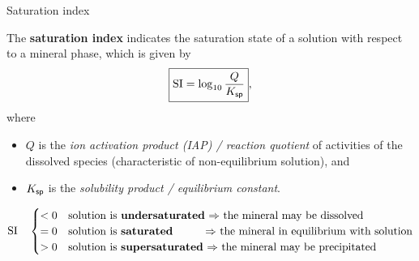 %
\begin{frame}{Saturation index}

The \alert{\textbf{saturation index}} indicates the saturation state of
a solution with respect to a mineral phase, which is given by
%
\[
\boxed{ \mathrm{SI} = \log_{10} \frac{Q}{K_{\sf sp}}},
\] 
where 
\begin{itemize}
\item $Q$ is the \emph{ion activation product (IAP) / reaction quotient} of activities of the dissolved species (characteristic of non-equilibrium solution), 
and 
\item $K_{\sf sp}$ is the \emph{solubility product / equilibrium constant}. 
\end{itemize}
%
\[
\mathrm{SI} \quad 
\begin{cases}
< 0& \mbox{solution is \textbf{undersaturated} $\Rightarrow$ the mineral may be dissolved }\\
= 0& \mbox{solution is \textbf{saturated} \qquad \; $\Rightarrow$ the mineral in equilibrium with solution}\\
> 0 & \mbox{solution is \textbf{supersaturated} $\Rightarrow$ the mineral may be precipitated}
\end{cases}
\]
%

\end{frame}
%
%
